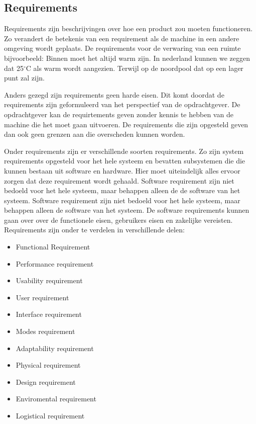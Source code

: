 \documentclass{article}%
\begin{document}
\subsection{Requirements}
Requirements zijn beschrijvingen over hoe een product zou moeten functioneren. Zo verandert de betekenis van een requirement als de machine in een andere omgeving wordt geplaats. De requirements voor de verwaring van een ruimte bijvoorbeeld: Binnen moet het altijd warm zijn. In nederland kunnen we zeggen dat 25$^{\circ}$C als warm wordt aangezien. Terwijl op de noordpool dat op een lager punt zal zijn.

Anders gezegd zijn requirements geen harde eisen. Dit komt doordat de requirements zijn geformuleerd van het perspectief van de opdrachtgever. De opdrachtgever kan de requirtements geven zonder kennis te hebben van de machine die het moet gaan uitvoeren. De requirements die zijn opgesteld geven dan ook geen grenzen aan die overscheden kunnen worden.

Onder requirements zijn er verschillende soorten requirements. Zo zijn system requirements opgesteld voor het hele systeem en bevatten subsystemen die die kunnen bestaan uit software en hardware. Hier moet uiteindelijk alles ervoor zorgen dat deze requirement wordt gehaald. Software requirement zijn niet bedoeld voor het hele systeem, maar behappen alleen de de software van het systeem. Software requirement zijn niet bedoeld voor het hele systeem, maar behappen alleen de software van het systeem. De software requirements kunnen gaan over over de functionele eisen, gebruikers eisen en zakelijke vereisten.
Requirements zijn onder te verdelen in verschillende delen: 
\begin{multicols}{2}
\begin{itemize}
\item Functional Requirement
\item Performance requirement
\item Usability requirement
\item User requirement
\item Interface requirement
\item Modes requirement
\item Adaptability requirement
\item Physical requirement
\item Design requirement
\item Enviromental requirement
\item Logistical requirement
\end{itemize}
\end{multicols}
\end{document}
